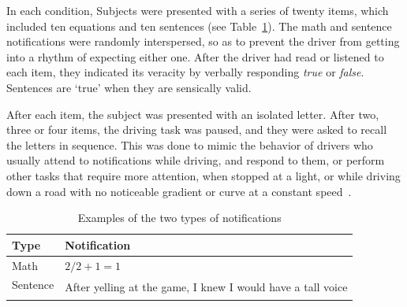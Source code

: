 In each condition, Subjects were presented with a series of twenty items, which included ten equations and ten sentences (see Table~\ref{table:span}). The math and sentence notifications were randomly interspersed, so as to prevent the driver from getting into a rhythm of expecting either one. After the driver had read or listened to each item, they indicated its veracity by verbally responding \textit{true} or \textit{false}. Sentences are `true' when they are sensically valid. 

After each item, the subject was presented with an isolated letter. After two, three or four items, the driving task was paused, and they were asked to recall the letters in sequence. This was done to mimic the behavior of drivers who usually attend to notifications while driving, and respond to them, or perform other tasks that require more attention, when stopped at a light, or while driving down a road with no noticeable gradient or curve at a constant speed~\cite{kim2015}. 

\renewcommand{\arraystretch}{1.3}
\begin{table} \centering
\begin{tabular}{@{}ll@{}}\toprule
\textbf{Type} & \textbf{Notification} \\ \midrule 
Math & $2/2 + 1 = 1$ \\ 
Sentence & \multirow{2}{5cm}{After yelling at the game, I knew I would have a tall voice}  \\ & \\
\bottomrule
\end{tabular}
\caption{Examples of the two types of notifications }
\label{table:span}
\end{table}



